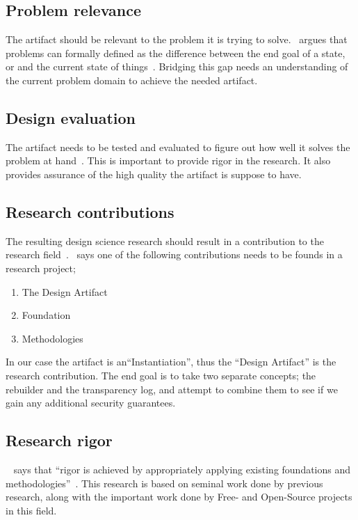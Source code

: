 \documentclass[../Main/thesis.tex]{subfiles}
\begin{document}
\subsection*{Problem relevance}%
\label{sub:problem_relevance}
The artifact should be relevant to the problem it is trying to
solve.~\citeauthor{Hevner:2004:DSI:2017212.2017217} argues that problems can
formally defined as the difference between the end goal of a state, or and the
current state of things~\cite{Hevner:2004:DSI:2017212.2017217}. Bridging this
gap needs an understanding of the current problem domain to achieve the needed
artifact.

\subsection*{Design evaluation}%
\label{sub:design_evaluation}
The artifact needs to be tested and evaluated to figure out how well it solves
the problem at hand~\cite{Hevner:2004:DSI:2017212.2017217}. This is important to
provide rigor in the research. It also provides assurance of the high quality
the artifact is suppose to have.

\subsection*{Research contributions}%
\label{sub:research_contributions}
The resulting design science research should result in a contribution to the
research
field~\cite{Hevner:2004:DSI:2017212.2017217}.~\citeauthor{Hevner:2004:DSI:2017212.2017217}
says one of the following contributions needs to be founds in a research
project;

\begin{enumerate}
    \item The Design Artifact
    \item Foundation
    \item Methodologies
\end{enumerate}

In our case the artifact is an``Instantiation'', thus the ``Design Artifact'' is
the research contribution. The end goal is to take two separate concepts; the
rebuilder and the transparency log, and attempt to combine them to see if we
gain any additional security guarantees.

\subsection*{Research rigor}%
\label{sub:research_rigor}
~\citeauthor{Hevner:2004:DSI:2017212.2017217} says that ``rigor is achieved by
appropriately applying existing foundations and
methodologies''~\cite{Hevner:2004:DSI:2017212.2017217}. This research is based
on seminal work done by previous research, along with the important work done by
Free- and Open-Source projects in this field. 
\end{document}
